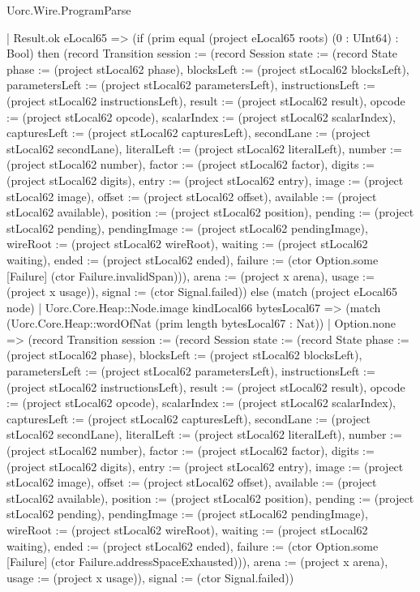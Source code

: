 \begin{lexlean}{Uorc.Wire.ProgramParse}
\begin{semanticmodule}
{      | Result.ok eLocal65 => (if (prim equal (project eLocal65 roots) (0 : UInt64) : Bool) then (record Transition {session := (record Session {state := (record State {phase := (project stLocal62 phase), blocksLeft := (project stLocal62 blocksLeft), parametersLeft := (project stLocal62 parametersLeft), instructionsLeft := (project stLocal62 instructionsLeft), result := (project stLocal62 result), opcode := (project stLocal62 opcode), scalarIndex := (project stLocal62 scalarIndex), capturesLeft := (project stLocal62 capturesLeft), secondLane := (project stLocal62 secondLane), literalLeft := (project stLocal62 literalLeft), number := (project stLocal62 number), factor := (project stLocal62 factor), digits := (project stLocal62 digits), entry := (project stLocal62 entry), image := (project stLocal62 image), offset := (project stLocal62 offset), available := (project stLocal62 available), position := (project stLocal62 position), pending := (project stLocal62 pending), pendingImage := (project stLocal62 pendingImage), wireRoot := (project stLocal62 wireRoot), waiting := (project stLocal62 waiting), ended := (project stLocal62 ended), failure := (ctor Option.some [Failure] (ctor Failure.invalidSpan))}), arena := (project x arena), usage := (project x usage)}), signal := (ctor Signal.failed)}) else (match (project eLocal65 node)
        | Uorc.Core.Heap::Node.image kindLocal66 bytesLocal67 => (match (Uorc.Core.Heap::wordOfNat (prim length bytesLocal67 : Nat))
          | Option.none => (record Transition {session := (record Session {state := (record State {phase := (project stLocal62 phase), blocksLeft := (project stLocal62 blocksLeft), parametersLeft := (project stLocal62 parametersLeft), instructionsLeft := (project stLocal62 instructionsLeft), result := (project stLocal62 result), opcode := (project stLocal62 opcode), scalarIndex := (project stLocal62 scalarIndex), capturesLeft := (project stLocal62 capturesLeft), secondLane := (project stLocal62 secondLane), literalLeft := (project stLocal62 literalLeft), number := (project stLocal62 number), factor := (project stLocal62 factor), digits := (project stLocal62 digits), entry := (project stLocal62 entry), image := (project stLocal62 image), offset := (project stLocal62 offset), available := (project stLocal62 available), position := (project stLocal62 position), pending := (project stLocal62 pending), pendingImage := (project stLocal62 pendingImage), wireRoot := (project stLocal62 wireRoot), waiting := (project stLocal62 waiting), ended := (project stLocal62 ended), failure := (ctor Option.some [Failure] (ctor Failure.addressSpaceExhausted))}), arena := (project x arena), usage := (project x usage)}), signal := (ctor Signal.failed)})
}
\end{semanticmodule}
\end{lexlean}
